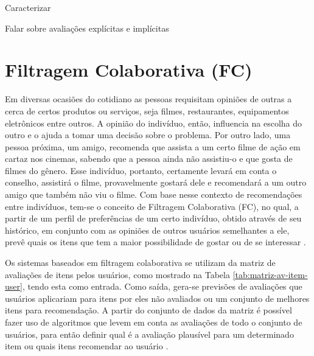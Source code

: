 
Caracterizar

Falar sobre avaliações explícitas e implícitas


\section{Filtragem Colaborativa (FC)}
    
    Em diversas ocasiões do cotidiano as pessoas requisitam opiniões de outras a cerca de certos produtos ou serviços, seja filmes, restaurantes, equipamentos eletrônicos entre outros. A opinião do indivíduo, então, influencia na escolha do outro e o ajuda a tomar uma decisão sobre o problema. Por outro lado, uma pessoa próxima, um amigo, recomenda que assista a um certo filme de ação em cartaz nos cinemas, sabendo que a pessoa ainda não assistiu-o e que gosta de filmes do gênero. Esse indivíduo, portanto, certamente levará em conta o conselho, assistirá o filme, provavelmente gostará dele e recomendará a um outro amigo que também não viu o filme.    
    Com base nesse contexto de recomendações entre indivíduos, tem-se o conceito de Filtragem Colaborativa (FC), no qual, a partir de um perfil de preferências de um certo indivíduo, obtido através de seu histórico, em conjunto com as opiniões de outros usuários semelhantes a ele, prevê quais os itens que tem a maior possibilidade de gostar ou de se interessar \cite{Jannach2010}.



    
    Os sistemas baseados em filtragem colaborativa se utilizam da matriz de avaliações de itens pelos usuários, como mostrado na Tabela \ref{tab:matriz-av-item-user}, tendo esta como entrada. Como saída, gera-se previsões de avaliações que usuários aplicariam para itens por eles não avaliados ou um conjunto de melhores itens para recomendação. A partir do conjunto de dados da matriz é possível fazer uso de algoritmos que levem em conta as avaliações de todo o conjunto de usuários, para então definir qual é a avaliação plausível para um determinado item ou quais itens recomendar ao usuário \cite{Bobadilla_2013}.
    
